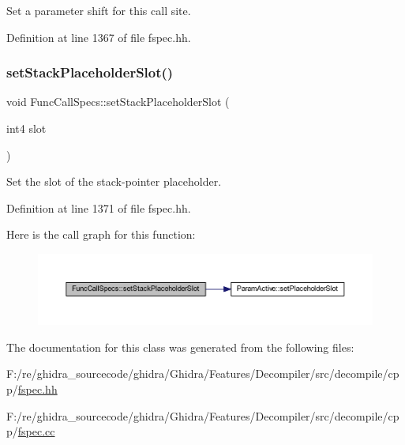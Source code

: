 Set a parameter shift for this call site. 



Definition at line 1367 of file fspec.\+hh.

\mbox{\label{class_func_call_specs_ab398038b75b6f13b865384da3fd143b9}} 
\subsubsection{\texorpdfstring{setStackPlaceholderSlot()}{setStackPlaceholderSlot()}}
{\footnotesize\ttfamily void Func\+Call\+Specs\+::set\+Stack\+Placeholder\+Slot (\begin{DoxyParamCaption}\item[{int4}]{slot }\end{DoxyParamCaption})\hspace{0.3cm}{\ttfamily [inline]}}



Set the slot of the stack-\/pointer placeholder. 



Definition at line 1371 of file fspec.\+hh.

Here is the call graph for this function\+:
\nopagebreak
\begin{figure}[H]
\begin{center}
\leavevmode
\includegraphics[width=350pt]{class_func_call_specs_ab398038b75b6f13b865384da3fd143b9_cgraph}
\end{center}
\end{figure}


The documentation for this class was generated from the following files\+:\begin{DoxyCompactItemize}
\item 
F\+:/re/ghidra\+\_\+sourcecode/ghidra/\+Ghidra/\+Features/\+Decompiler/src/decompile/cpp/\mbox{\hyperlink{fspec_8hh}{fspec.\+hh}}\item 
F\+:/re/ghidra\+\_\+sourcecode/ghidra/\+Ghidra/\+Features/\+Decompiler/src/decompile/cpp/\mbox{\hyperlink{fspec_8cc}{fspec.\+cc}}\end{DoxyCompactItemize}

